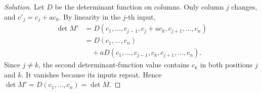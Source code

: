 \begin{proof}[Solution]
Let \(D\) be the determinant function on columns. Only column \(j\)
changes, and \(c'_j=c_j+ac_k\). By linearity in the \(j\)-th input,
\begin{align*}
  \det M'
    &=D(c_1,\ldots,c_{j-1},c_j+ac_k,c_{j+1},\ldots,c_n)\\
    &=D(c_1,\ldots,c_n)\\
    &\quad+aD(c_1,\ldots,c_{j-1},c_k,c_{j+1},\ldots,c_n).
\end{align*}
Since \(j\ne k\), the second determinant-function value contains
\(c_k\) in both positions \(j\) and \(k\). It vanishes because its
inputs repeat. Hence \(\det M'=D(c_1,\ldots,c_n)=\det M\).
\end{proof}

